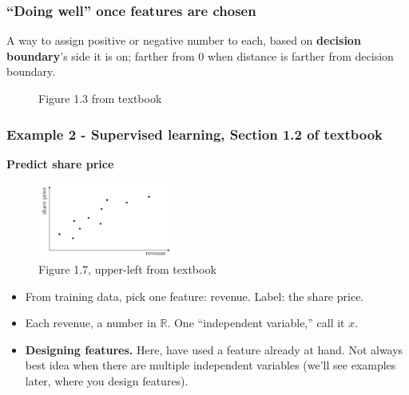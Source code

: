 \documentclass{beamer}
\theoremstyle{example}
\newcommand{\bb}[1]{\mathbb{#1}}
\begin{document}
\begin{frame}
    \frametitle{``Doing well'' once features are chosen}
    A way to assign positive or negative number to each, based on \textbf{decision boundary}'s side it is on; farther from 0 when distance is farther from decision boundary.
    
    \pause
    \begin{figure}
    \caption*{Figure 1.3 from textbook}
    \end{figure}
\end{frame}

\begin{frame}
\frametitle{Example 2 - Supervised learning, Section 1.2 of textbook}
\textbf{Predict share price}

\begin{figure}
\includegraphics[width=0.4\textwidth]{../../Images/Fig1-7a.png}
\caption*{Figure 1.7, upper-left from textbook}
\end{figure}

\begin{itemize}
    \item From training data, pick one feature: revenue. Label: the share price.
    \pause
    \item Each revenue, a number in $\bb R$. One ``independent variable,'' call it $x$.
    \pause
    \item \textbf{Designing features.} Here, have used a feature already at hand. Not always best idea when there are multiple independent variables (we'll see examples later, where you design features).
\end{itemize}
\end{frame}
\end{document}
